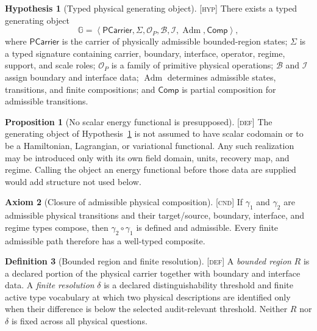 \documentclass[11pt]{article}
\newcommand{\Adm}{\operatorname{Adm}}
\newcommand{\Gobj}{\ensuremath{\mathbb{G}}}
\newcommand{\Defn}{\textsc{[def]}}
\newcommand{\Cnd}{\textsc{[cnd]}}
\newcommand{\Hyp}{\textsc{[hyp]}}
\theoremstyle{definition}
\newtheorem{sdefinition}{Definition}
\newtheorem{sproposition}{Proposition}
\newtheorem{shypothesis}[sdefinition]{Hypothesis}
\newtheorem{saxiom}[sdefinition]{Axiom}
\begin{document}
\begin{shypothesis}[Typed physical generating object]
\label{arch:hyp-generator}
\Hyp{} There exists a typed generating object
\begin{equation}
\Gobj=\left\langle
\mathsf{PCarrier},\Sigma,\mathcal O_P,\mathcal B,\mathcal I,\Adm,\mathsf{Comp}
\right\rangle,
\label{arch:eq-generator}
\end{equation}
where $\mathsf{PCarrier}$ is the carrier of physically admissible bounded-region
states; $\Sigma$ is a typed signature containing carrier, boundary, interface,
operator, regime, support, and scale roles; $\mathcal O_P$ is a family of primitive
physical operations; $\mathcal B$ and $\mathcal I$ assign boundary and interface
data; $\Adm$ determines admissible states, transitions, and finite compositions;
and $\mathsf{Comp}$ is partial composition for admissible transitions.
\end{shypothesis}

\begin{sproposition}[No scalar energy functional is presupposed]
\label{arch:prop-not-scalar}
\Defn{} The generating object of Hypothesis~\ref{arch:hyp-generator} is not assumed
to have scalar codomain or to be a Hamiltonian, Lagrangian, or variational
functional. Any such realization may be introduced only with its own field domain,
units, recovery map, and regime. Calling the object an energy functional before
those data are supplied would add structure not used below.
\end{sproposition}

\begin{saxiom}[Closure of admissible physical composition]
\label{arch:ax-closure}
\Cnd{} If $\gamma_1$ and $\gamma_2$ are admissible physical transitions and their
target/source, boundary, interface, and regime types compose, then
$\gamma_2\circ\gamma_1$ is defined and admissible. Every finite admissible path
therefore has a well-typed composite.
\end{saxiom}

\begin{sdefinition}[Bounded region and finite resolution]
\label{arch:def-region-resolution}
\Defn{} A \emph{bounded region} $R$ is a declared portion of the physical carrier
together with boundary and interface data. A \emph{finite resolution} $\delta$ is a
declared distinguishability threshold and finite active type vocabulary at which
two physical descriptions are identified only when their difference is below the
selected audit-relevant threshold. Neither $R$ nor $\delta$ is fixed across all
physical questions.
\end{sdefinition}
\end{document}
